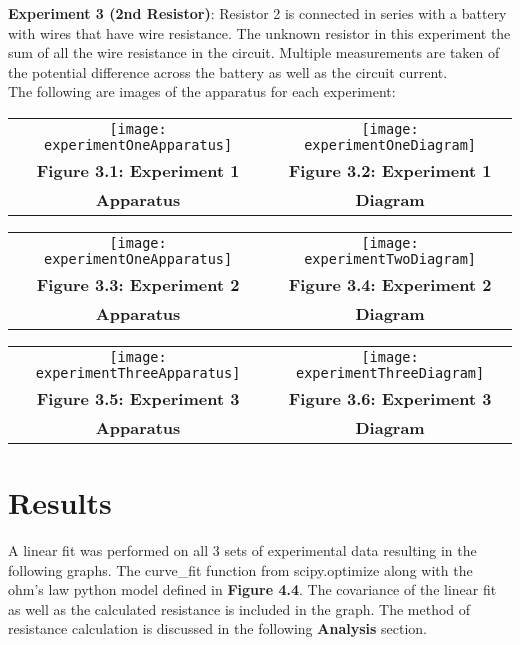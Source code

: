 \documentclass[
	letterpaper, %
	12pt, %
]{CSUniSchoolLabReport}
\begin{document}
\textbf{Experiment 3 (2nd Resistor)}: Resistor 2 is connected in series with a battery with wires that have wire resistance. The unknown resistor in this experiment the sum of all the wire resistance in the circuit. Multiple measurements are taken of the potential difference across the battery as well as the circuit current.\\

The following are images of the apparatus for each experiment:\\

\begin{tabular}{c c}
    \texttt{[image: experimentOneApparatus]} & \texttt{[image: experimentOneDiagram]}\\
	\textbf{Figure 3.1: Experiment 1} & \textbf{Figure 3.2: Experiment 1}\\
	\textbf{Apparatus} & \textbf{Diagram}
\end{tabular}

\begin{tabular}{c c}
    \texttt{[image: experimentOneApparatus]} & \texttt{[image: experimentTwoDiagram]}\\
	\textbf{Figure 3.3: Experiment 2} & \textbf{Figure 3.4: Experiment 2}\\
	\textbf{Apparatus} & \textbf{Diagram}
\end{tabular}

\begin{tabular}{c c}
\texttt{[image: experimentThreeApparatus]} &  \texttt{[image: experimentThreeDiagram]}\\
\textbf{Figure 3.5: Experiment 3} &  \textbf{Figure 3.6: Experiment 3}\\
\textbf{Apparatus} & \textbf{Diagram}
\end{tabular}

\section{Results}
A linear fit was performed on all 3 sets of experimental data resulting in the following graphs. The curve\_fit function from scipy.optimize along with the ohm's law python model defined in \textbf{Figure 4.4}. The covariance of the linear fit as well as the calculated resistance is included in the graph. The method of resistance calculation is discussed in the following \textbf{Analysis} section.
\end{document}
